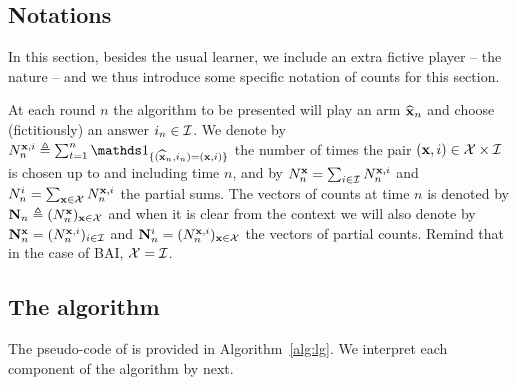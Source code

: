 
\subsection{Notations}

In this section, besides the usual learner, we include an extra fictive player -- the nature -- and we thus introduce some specific notation of counts for this section.

At each round $n$ the algorithm to be presented will play an arm $\widehat{{\bf x}}_n$ and choose (fictitiously) an answer $i_n\in\mathcal{I}$. We denote by $N_n^{\bx,i} \eqdef\sum_{t=1}^n \ind_{\{(\hbx_n,i_n)=(\bx,i)\}}$ the number of times the pair $({\bf x},i)\in\mathcal{X}\times\mathcal{I}$ is chosen up to and including time $n$, and by $N_n^{\bf x} =\sum_{i\in\mathcal{I}} N_n^{{\bf x},i}$ and $N_n^i =\sum_{{\bf x}\in\mathcal{X}} N_n^{{\bf x},i}$ the partial sums. The vectors of counts at time $n$ is denoted by ${\bf N}_n \triangleq (N_n^{\bf x})_{{\bf x}\in\mathcal{X}}$
and when it is clear from the context we will also denote by ${\bf N}_n^{{\bf x}} = (N_n^{{\bf x},i})_{i\in\mathcal{I}}$ and ${\bf N}_n^i = (N_n^{{\bf x},i})_{{\bf x}\in\mathcal{X}}$ the vectors of partial counts. Remind that in the case of BAI, $\mathcal{X}=\mathcal{I}$.



\subsection{The \LG{} algorithm}

The pseudo-code of \LG{} is provided in Algorithm~\ref{alg:lg}. We interpret each component of the algorithm by next.

